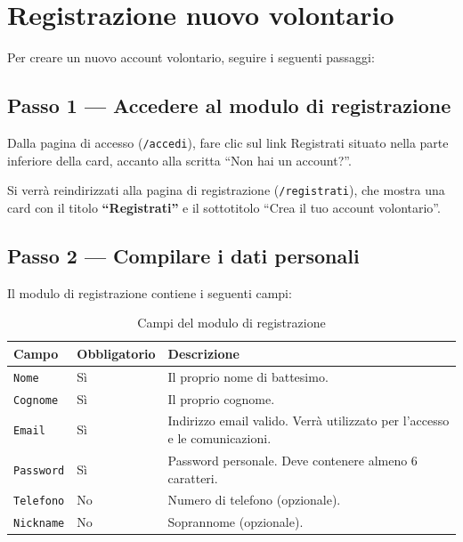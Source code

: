 \documentclass[a4paper,11pt,oneside]{book}
\newcommand{\campo}[1]{\texttt{#1}}
\newcommand{\percorso}[1]{\textcolor{namoCyan}{\texttt{#1}}}
\begin{document}
\section{Registrazione nuovo volontario}
\label{sec:registrazione-volontario}

Per creare un nuovo account volontario, seguire i seguenti passaggi:

\subsection{Passo 1 --- Accedere al modulo di registrazione}

Dalla pagina di accesso (\percorso{/accedi}), fare clic sul link \textcolor{namoCyan}{Registrati} situato nella parte inferiore della card, accanto alla scritta ``Non hai un account?''.

Si verr\`a reindirizzati alla pagina di registrazione (\percorso{/registrati}), che mostra una card con il titolo \textbf{``Registrati''} e il sottotitolo ``Crea il tuo account volontario''.

\subsection{Passo 2 --- Compilare i dati personali}

Il modulo di registrazione contiene i seguenti campi:

\begin{table}[htbp]
\centering
\caption{Campi del modulo di registrazione}
\label{tab:campi-registrazione}
\begin{tabularx}{\textwidth}{l l X}
\toprule
\textbf{Campo} & \textbf{Obbligatorio} & \textbf{Descrizione} \\
\midrule
\campo{Nome}      & S\`i & Il proprio nome di battesimo. \\
\campo{Cognome}   & S\`i & Il proprio cognome. \\
\campo{Email}     & S\`i & Indirizzo email valido. Verr\`a utilizzato per l'accesso e le comunicazioni. \\
\campo{Password}  & S\`i & Password personale. Deve contenere almeno 6 caratteri. \\
\campo{Telefono}  & No  & Numero di telefono (opzionale). \\
\campo{Nickname}  & No  & Soprannome (opzionale). \\
\bottomrule
\end{tabularx}
\end{table}
\end{document}
